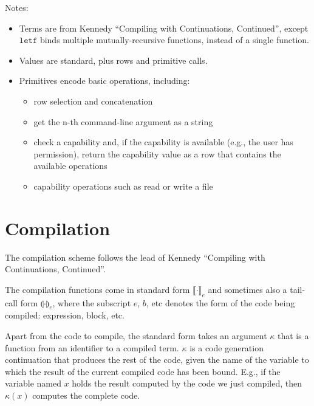 \documentclass[11pt]{article}
\newcommand{\kw}[1]{\mathtt{#1}}
\begin{document}
Notes:
\begin{itemize}
\item Terms are from Kennedy ``Compiling with Continuations, Continued'', except $\kw{letf}$ binds multiple mutually-recursive functions, instead of a single function.
\item Values are standard, plus rows and primitive calls.
\item Primitives encode basic operations, including:
\begin{itemize}
\item row selection and concatenation
\item get the n-th command-line argument as a string
\item check a capability and, if the capability is available (e.g., the user has permission), return the capability value as a row that contains the available operations
\item capability operations such as read or write a file
\end{itemize}
\end{itemize}

\newpage

\section{Compilation}

\newcommand{\cmp}[2]{\llbracket #2 \rrbracket_#1}
\newcommand{\cmpn}[1]{\cmp{#1}{\cdot}}
\newcommand{\cmpin}[3]{\cmp{#1}{#2}\;#3}
\newcommand{\cmpk}[2]{\cmp{#1}{#2}\;\kappa}

\newcommand{\tcmp}[2]{\llparenthesis #2 \rrparenthesis_#1}
\newcommand{\tcmpn}[1]{\tcmp{#1}{\cdot}}
\newcommand{\tcmpin}[3]{\tcmp{#1}{#2}\;#3}
\newcommand{\tcmpk}[2]{\tcmp{#1}{#2}\;k}

The compilation scheme follows the lead of Kennedy ``Compiling with Continuations, Continued''.

The compilation functions come in standard form $\cmpn{e}$ and sometimes also a tail-call form $\tcmpn{e}$, where the subscript $e$, $b$, etc denotes the form of the code being compiled: expression, block, etc.

Apart from the code to compile, the standard form takes an argument $\kappa$ that is a function from an identifier to a compiled term.
$\kappa$ is a code generation continuation that produces the rest of the code, given the name of the variable to which the result of the current compiled code has been bound.
E.g., if the variable named $x$ holds the result computed by the code we just compiled, then $\kappa(x)$ computes the complete code.
\end{document}
